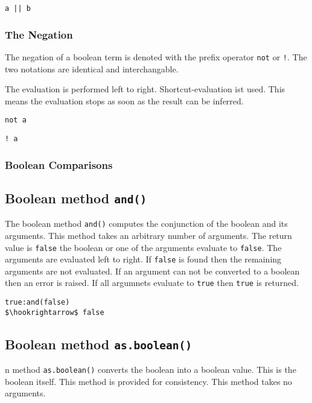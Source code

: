 \documentclass[11pt,a4paper]{scrbook}
\newcommand\keyword[1]{\texttt{#1}}
\newcommand\method[1]{\texttt{#1}}
\begin{document}
\begin{lstlisting}[language=BibTool]
a || b
\end{lstlisting}

\subsubsection{The Negation}

The negation of a boolean term is denoted with the prefix operator \keyword{not}
or \keyword{!}. The two notations are identical and interchangable.

The evaluation is performed left to right. Shortcut-evaluation ist used. This
means the evaluation stops as soon as the result can be inferred.

\begin{lstlisting}[language=BibTool]
not a
\end{lstlisting}

\begin{lstlisting}[language=BibTool]
! a
\end{lstlisting}

\subsubsection{Boolean Comparisons}




\subsection{Boolean method \method{and()}}

The boolean method \method{and()} computes the conjunction of the boolean and
its arguments. This method takes an arbitrary number of arguments. The return
value is \keyword{false} the boolean or one of the arguments evaluate to
\keyword{false}. The arguments are evaluated left to right. If \keyword{false}
is found then the remaining arguments are not evaluated. If an argument can
not be converted to a boolean then an error is raised. If all argumnets
evaluate to \keyword{true} then \keyword{true} is returned.

\begin{lstlisting}[language=BibTool,mathescape=true]
true:and(false)
$\hookrightarrow$ false
\end{lstlisting}

\subsection{Boolean method \method{as.boolean()}}
n method \method{as.boolean()} converts the boolean into a boolean
value. This is the boolean itself. This method is provided for consistency.
This method takes no arguments.
\end{document}
